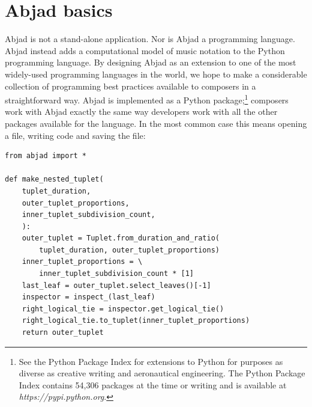 \documentclass{article}
\begin{document}
\section{Abjad basics} \label{sec:example}

Abjad is not a stand-alone application. Nor is Abjad a programming language.
Abjad instead adds a computational model of music notation to the Python
programming language. By designing Abjad as an extension to one of the most
widely-used programming languages in the world, we hope to make a considerable
collection of programming best practices available to composers in a
straightforward way. Abjad is implemented as a Python package;\footnote{See the
Python Package Index for extensions to Python for purposes as diverse as
creative writing and aeronautical engineering. The Python Package Index
contains 54,306 packages at the time or writing and is available at
\textit{https://pypi.python.org}.} composers work with Abjad exactly the same
way developers work with all the other packages available for the language. In
the most common case this means opening a file, writing code and saving the
file:

\begin{lstlisting}
from abjad import *

def make_nested_tuplet(
    tuplet_duration,
    outer_tuplet_proportions,
    inner_tuplet_subdivision_count,
    ):
    outer_tuplet = Tuplet.from_duration_and_ratio(
        tuplet_duration, outer_tuplet_proportions)
    inner_tuplet_proportions = \
        inner_tuplet_subdivision_count * [1]
    last_leaf = outer_tuplet.select_leaves()[-1]
    inspector = inspect_(last_leaf)
    right_logical_tie = inspector.get_logical_tie()
    right_logical_tie.to_tuplet(inner_tuplet_proportions)
    return outer_tuplet
\end{lstlisting}
\end{document}
